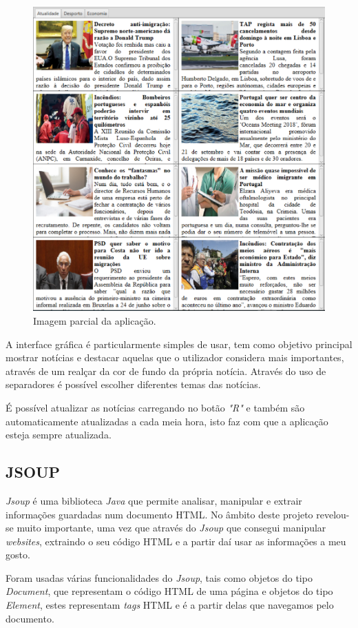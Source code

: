 \vspace{0,07cm}
\begin{figure}[H]
\centering
\includegraphics[scale=0.5]{imagens/app_img.png}
\caption{Imagem parcial da aplicação.}
\label{fig:gestao}
\end{figure}
A interface gráfica é particularmente simples de usar, tem como objetivo principal mostrar notícias e destacar aquelas que o utilizador considera mais importantes, através de um realçar da cor de fundo da própria notícia. Através do uso de separadores é possível escolher diferentes temas das notícias.\par
É possível atualizar as notícias carregando no botão \emph{"R"} e também são automaticamente atualizadas a cada meia hora, isto faz com que a aplicação esteja sempre atualizada.

\subsection{JSOUP}
\emph{Jsoup} é uma biblioteca \emph{Java} que permite analisar, manipular e extrair informações guardadas num documento \ac{HTML}. No âmbito deste projeto revelou-se muito importante, uma vez que através do \emph{Jsoup} que consegui manipular \emph{websites}, extraindo o seu código \ac{HTML} e a partir daí usar as informações a meu gosto.  \par 
Foram usadas várias funcionalidades do \emph{Jsoup}, tais como objetos do tipo \emph{Document},  que representam o código \ac{HTML} de uma página e objetos do tipo \emph{Element}, estes representam \emph{tags} \ac{HTML} e é a partir delas que navegamos pelo documento.

